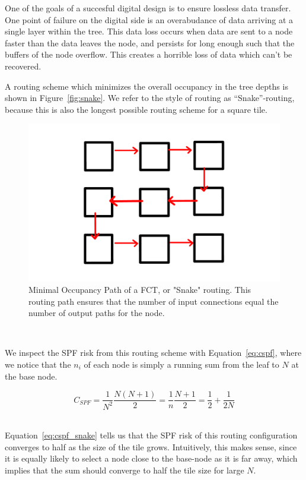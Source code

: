 One of the goals of a succesful digital design is to ensure lossless data transfer.
One point of failure on the digital side is an overabudance of data arriving at a single layer within the tree.
This data loss occurs when data are sent to a node faster than the data leaves the node, and persists for long enough such that the buffers of the node overflow.
This creates a horrible loss of data which can't be recovered.

A routing scheme which minimizes the overall occupancy in the tree depths is shown in Figure~\ref{fig:snake}.
We refer to the style of routing as ``Snake''-routing, because this is also the longest possible routing scheme for a square tile.

\begin{figure}[]
\centering
\includegraphics[width=\textwidth]{images/snakeroute.pdf}
\caption{Minimal Occupancy Path of a FCT, or "Snake" routing.
This routing path ensures that the number of input connections equal the number of output paths for the node.}
\end{figure}~\label{fig:snake}

We inspect the SPF risk from this routing scheme with Equation~\ref{eq:cspf}, where we notice that the $n_{i}$ of each node is simply a running sum from the leaf to $N$ at the base node.

\begin{equation}
  C_{SPF} = \frac{1}{N^{2}}\frac{N(N+1)}{2} = \frac{1}{n}\frac{N+1}{2} = \frac{1}{2} + \frac{1}{2N}
\end{equation}~\label{eq:cspf_snake}

Equation~\ref{eq:cspf_snake} tells us that the SPF risk of this routing configuration converges to half as the size of the tile grows.
Intuitively, this makes sense, since it is equally likely to select a node close to the base-node as it is far away, which implies that the sum should converge to half the tile size for large $N$.

